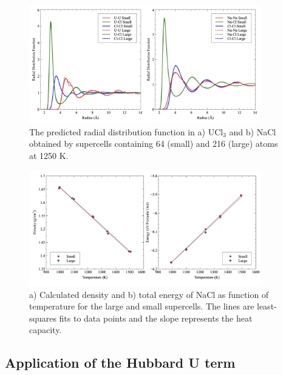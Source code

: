 \documentclass[preprint,3p,10pt,onecolumn,number,sort&compress]{elsarticle}
\begin{document}
{%

\begin{figure}[htb]
\centering
\includegraphics[width=0.9\textwidth]{fig1.jpg}
\caption{The predicted radial distribution function in a) UCl$_3$ and b) NaCl obtained by supercells containing 64 (small) and 216 (large) atoms at 1250 K.} 
\label{fig:radial}
\end{figure}

\begin{figure}[htb]
\centering
\includegraphics[width=0.9\textwidth]{fig2.jpg}
\caption{a) Calculated density and b) total energy of NaCl as function of temperature for the large and small supercells. The lines are least-squares fits to data points and the slope represents the heat capacity.} 
\label{fig:NaClsize}
\end{figure}




\subsection{Application of the Hubbard U term}

}
\end{document}
